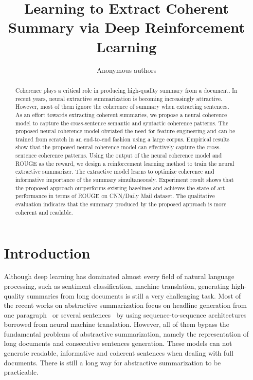 \documentclass[letterpaper]{article} %
\begin{document}
	\title{Learning to Extract Coherent Summary via Deep Reinforcement Learning}
	\author{Anonymous authors}
	\maketitle
	\begin{abstract}
		 Coherence plays a critical role in producing high-quality summary from a document. In recent years, neural extractive summarization is becoming increasingly attractive. However, most of them ignore the coherence of summary when extracting sentences. As an effort towards extracting coherent summaries, we propose a neural coherence model to capture the cross-sentence semantic and syntactic coherence patterns. The proposed neural coherence model obviated the need for feature engineering and can be trained from scratch in an end-to-end fashion using a large corpus. Empirical results show that the proposed neural coherence model can effectively capture the cross-sentence coherence patterns. Using the output of the neural coherence model and ROUGE as the reward, we design a reinforcement learning method to train the neural extractive summarizer. The extractive model learns to optimize coherence and informative importance of the summary simultaneously. Experiment result shows that the proposed approach outperforms existing baselines and achieves the state-of-art performance in terms of ROUGE on CNN/Daily Mail dataset. The qualitative evaluation indicates that the summary produced by the proposed approach is more coherent and readable.
	\end{abstract}
	
	
	\section{Introduction}
	Although deep learning has dominated almost every field of natural language processing, such as sentiment classification\cite{duyutang-sentiment}, machine translation\cite{cho-translation}, generating high-quality summaries from long documents is still a very challenging task. Most of the recent works on abstractive summarization focus on headline generation from one paragraph~\cite{fb2015} or several sentences~\cite{lcsts} by using sequence-to-sequence architectures borrowed from neural machine translation. However, all of them bypass the fundamental problems of abstractive summarization, namely the representation of long documents and consecutive sentences generation. These models can not generate readable, informative and coherent sentences when dealing with full documents.  There is still a long way for abstractive summarization to be practicable.
	
\end{document}
